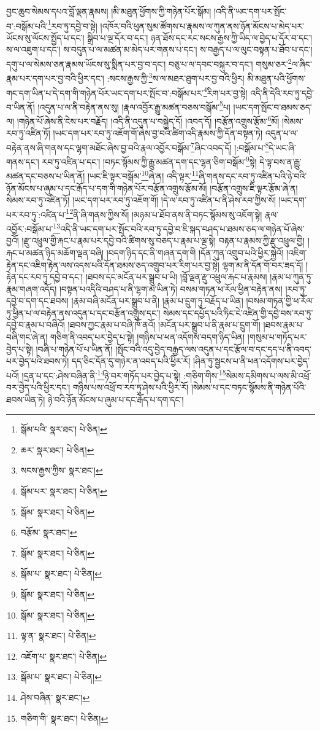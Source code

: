 བྱང་ཆུབ་སེམས་དཔའ་བློ་ལྡན་རྣམས། །མི་མཐུན་ཕྱོགས་ཀྱི་གཉེན་པོར་སྒོམ། །འདི་ནི་ཡང་དག་པར་སྤོང་བ་:བསྒོམ་པའི་\footnote{སྒོམ་པའི་  སྣར་ཐང་།  པེ་ཅིན། }རབ་ཏུ་དབྱེ་བ་སྟེ། །འཁོར་བའི་ཕུན་སུམ་ཚོགས་པ་རྣམས་ལ་ཀུན་ནས་ཉོན་མོངས་པ་མེད་པར་ཡོངས་སུ་ལོངས་སྤྱོད་པ་དང་། སྒྲིབ་པ་ལྔ་དོར་བ་དང་། ཉན་ཐོས་དང་རང་སངས་རྒྱས་ཀྱི་ཡིད་ལ་བྱེད་པ་དོར་བ་དང་། ས་ལ་འཇུག་པ་དང་། ས་བདུན་པ་ལ་མཚན་མ་མེད་པར་གནས་པ་དང་། ས་བརྒྱད་པ་ལ་ལུང་བསྟན་པ་ཐོབ་པ་དང་། དགུ་པ་ལ་སེམས་ཅན་རྣམས་ཡོངས་སུ་སྨིན་པར་བྱ་བ་དང་། བཅུ་པ་ལ་དབང་བསྐུར་བ་དང་། གསུམ་ཅར་\footnote{ཆར་  སྣར་ཐང་།  པེ་ཅིན། }ལ་ཞིང་རྣམ་པར་དག་པར་བྱ་བའི་ཕྱིར་དང་། :སངས་རྒྱས་ཀྱི་\footnote{སངས་རྒྱས་ཀྱིས་  སྣར་ཐང་། }ས་ལ་མཐར་ཐུག་པར་བྱ་བའི་ཕྱིར། མི་མཐུན་པའི་ཕྱོགས་གང་དག་ཡིན་པ་དེ་དག་གི་གཉེན་པོར་ཡང་དག་པར་སྤོང་བ་:བསྒོམ་པར་\footnote{སྒོམ་པར་  སྣར་ཐང་།  པེ་ཅིན། }རིག་པར་བྱ་སྟེ། འདི་ནི་དེའི་རབ་ཏུ་དབྱེ་བ་ཡིན་ནོ། །འདུན་པ་ལ་ནི་བརྟེན་ནས་སུ། །རྣལ་འབྱོར་རྒྱུ་མཚན་བཅས་བསྒོམ་\footnote{སྒོམ་  སྣར་ཐང་།  པེ་ཅིན། }པ། །ཡང་དག་སྤོང་བ་ཐམས་ཅད་ལ། །གཉེན་པོ་ཞེས་ནི་ངེས་པར་བརྗོད། །འདི་ནི་འདུན་པ་བསྐྱེད་དོ། །འབད་དོ། །བརྩོན་འགྲུས་རྩོམ་\footnote{བརྩོམ་  སྣར་ཐང་། }མོ། །སེམས་རབ་ཏུ་འཛིན་ཏོ། །ཡང་དག་པར་རབ་ཏུ་འཇོག་གོ་ཞེས་བྱ་བའི་ཚིག་འདི་རྣམས་ཀྱི་དོན་བསྟན་ཏེ། འདུན་པ་ལ་བརྟེན་ནས་ཞི་གནས་དང་ལྷག་མཐོང་ཞེས་བྱ་བའི་རྣལ་འབྱོར་བསྒོམ་\footnote{སྒོམ་  སྣར་ཐང་།  པེ་ཅིན། }ཞིང་འབད་དོ། །:བསྒོམ་པ་\footnote{སྒོམ་པ་  སྣར་ཐང་།  པེ་ཅིན། }དེ་ཡང་ཞི་གནས་དང་། རབ་ཏུ་འཛིན་པ་དང་། །བཏང་སྙོམས་ཀྱི་རྒྱུ་མཚན་དག་དང་ལྷན་ཅིག་བསྒོམ་\footnote{སྒོམ་  སྣར་ཐང་།  པེ་ཅིན། }སྟེ། དེ་ལྟ་བས་ན་རྒྱུ་མཚན་དང་བཅས་པ་ཡིན་ནོ། །ཡང་ཇི་ལྟར་བསྒོམ་\footnote{སྒོམ་  སྣར་ཐང་།  པེ་ཅིན། }ཞེ་ན། འདི་ལྟར་\footnote{ལྟ་ན་  སྣར་ཐང་།  པེ་ཅིན། }ཞི་གནས་དང་རབ་ཏུ་འཛིན་པའི་ཉེ་བའི་ཉོན་མོངས་པ་ཞུམ་པ་དང་རྒོད་པ་དག་གི་གཉེན་པོར་བརྩོན་འགྲུས་རྩོམ་མོ། །བརྩོན་འགྲུས་ཇི་ལྟར་རྩོམ་ཞེ་ན། སེམས་རབ་ཏུ་འཛིན་ཏོ། །ཡང་དག་པར་རབ་ཏུ་འཇོག་གོ། །དེ་ལ་རབ་ཏུ་འཛིན་པ་ནི་ཤེས་རབ་ཀྱིས་སོ། །ཡང་དག་པར་རབ་ཏུ་:འཛིན་པ་\footnote{འཇོག་པ་  སྣར་ཐང་།  པེ་ཅིན། }ནི་ཞི་གནས་ཀྱིས་སོ། །མཉམ་པ་ཐོབ་ནས་ནི་བཏང་སྙོམས་སུ་འཇོག་སྟེ། རྣལ་འབྱོར་:བསྒོམ་པ་\footnote{སྒོམ་པ་  སྣར་ཐང་།  པེ་ཅིན། }འདི་ནི་ཡང་དག་པར་སྤོང་བའི་རབ་ཏུ་དབྱེ་བ་ཇི་སྐད་བཤད་པ་ཐམས་ཅད་ལ་གཉེན་པོ་ཞེས་བྱའོ། །རྫུ་འཕྲུལ་གྱི་རྐང་པ་རྣམ་པར་དབྱེ་བའི་ཚིགས་སུ་བཅད་པ་རྣམ་པ་ལྔ་སྟེ། བརྟན་པ་རྣམས་ཀྱི་རྫུ་འཕྲུལ་གྱི། །རྐང་པ་མཚན་ཉིད་མཆོག་ལྡན་བཞི། །བདག་ཉིད་དང་ནི་གཞན་དག་གི །དོན་ཀུན་འགྲུབ་པའི་ཕྱིར་སྐྱེའོ། །འཇིག་རྟེན་དང་འཇིག་རྟེན་ལས་འདས་པའི་དོན་ཐམས་ཅད་འགྲུབ་པར་རིག་པར་བྱ་སྟེ། ལྷག་མ་ནི་དོན་གོ་བར་ཟད་དོ། །རྟེན་དང་རབ་ཏུ་དབྱེ་བ་དང་། །ཐབས་དང་མངོན་པར་སྒྲུབ་པ་ཡི། །བློ་ལྡན་རྫུ་འཕྲུལ་རྐང་པ་རྣམས། །རྣམ་པ་ཀུན་ཏུ་རྣམ་གཞག་འདོད། །བསྟན་པའདིའི་བཤད་པ་ནི་ལྷག་མ་ཡིན་ཏེ། བསམ་གཏན་ཕ་རོལ་ཕྱིན་བརྟེན་ནས། །རབ་ཏུ་དབྱེ་བ་དག་དང་ཐབས། །རྣམ་བཞི་མངོན་པར་སྒྲུབ་པ་ནི། །རྣམ་པ་དྲུག་ཏུ་བརྗོད་པ་ཡིན། །བསམ་གཏན་གྱི་ཕ་རོལ་ཏུ་ཕྱིན་པ་ལ་བརྟེན་ནས་འདུན་པ་དང་བརྩོན་འགྲུས་དང་། སེམས་དང་དཔྱོད་པའི་ཏིང་ངེ་འཛིན་གྱི་དབྱེ་བས་རབ་ཏུ་དབྱེ་བ་རྣམ་པ་བཞིའོ། །ཐབས་ཀྱང་རྣམ་པ་བཞི་ཁོ་ནའོ། །མངོན་པར་སྒྲུབ་པ་ནི་རྣམ་པ་དྲུག་གོ། །ཐབས་རྣམ་པ་བཞི་གང་ཞེ་ན། གཅིག་ནི་འབད་པར་བྱེད་པ་སྟེ། །གཉིས་པ་ཕན་འདོགས་བདག་ཉིད་ཡིན། །གསུམ་པ་གཏོད་པར་བྱེད་པ་སྟེ། །བཞི་པ་གཉེན་པོ་པ་ཡིན་ནོ། །སྤོང་བའི་འདུ་བྱེད་བརྒྱད་ལས་འདུན་པ་དང་རྩོལ་བ་དང་དད་པ་ནི་འབད་པར་བྱེད་པའི་ཐབས་ཏེ། དད་ཅིང་དོན་དུ་གཉེར་ན་འབད་པའི་ཕྱིར་རོ། །ཤིན་ཏུ་སྦྱངས་པ་ནི་ཕན་འདོགས་པར་བྱེད་པའོ། །དྲན་པ་དང་:ཤེས་བཞིན་ནི་\footnote{ཤེས་བཞིན་  སྣར་ཐང་། }ཉེ་བར་གཏོད་པར་བྱེད་པ་སྟེ། :གཅིག་གིས་\footnote{གཅིག་གི་  སྣར་ཐང་།  པེ་ཅིན། }སེམས་དམིགས་པ་ལས་མི་འཕྲོ་བར་བྱེད་པའི་ཕྱིར་དང་། གཉིས་པས་འཕྲོ་བ་རབ་ཏུ་ཤེས་པའི་ཕྱིར་རོ། །སེམས་པ་དང་བཏང་སྙོམས་ནི་གཉེན་པོའི་ཐབས་ཡིན་ཏེ། ཉེ་བའི་ཉོན་མོངས་པ་ཞུམ་པ་དང་རྒོད་པ་དག་དང་། 